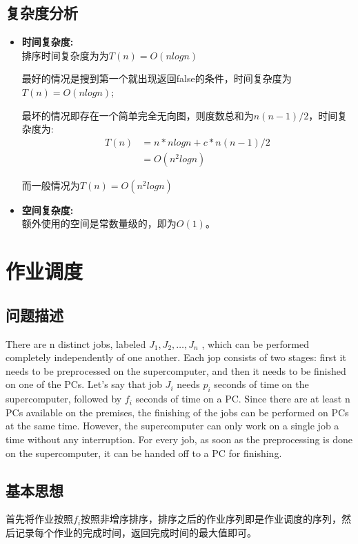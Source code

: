 \documentclass[UTF8,a4paper,12pt]{article}
\begin{document}
\begin{CJK}{UTF8}{gkai}
	\subsection{复杂度分析}		
		\begin{itemize}
			\item{\textbf{时间复杂度:}} \\
			排序时间复杂度为为$ T(n)=O(nlogn) $
			
			最好的情况是搜到第一个就出现返回false的条件，时间复杂度为$ T(n)=O(nlogn) $;
			
			最坏的情况即存在一个简单完全无向图，则度数总和为$ n(n-1)/2 $，时间复杂度为:
			\begin{align*}
			T(n) &= n*nlogn+c*n(n-1)/2\\
			&=O(n^{2}logn)
			\end{align*}
			
			而一般情况为$ T(n)=O(n^{2}logn) $
			
			\item{\textbf{空间复杂度:}}\\
			额外使用的空间是常数量级的，即为$ O(1) $。
		\end{itemize}


	\newpage
	\section{作业调度}
	\subsection{问题描述}
		There are n distinct jobs, labeled $ J_{1} , J_{2} , \dots , J_{n} $ , which can be performed completely independently of one another. Each jop consists of two stages: first it needs to be preprocessed on the supercomputer, and then it needs to be finished on one of the PCs. Let’s say that job $ J_{i} $ needs $ p_{i} $ seconds of time on the supercomputer, followed by $ f_{i} $ seconds of time on a PC. Since there are at least n PCs available on the premises, the finishing of the jobs can be performed on PCs at the same time. However, the supercomputer can only work on a single job a time without any interruption. For every job, as soon as the preprocessing is done on the supercomputer, it can be handed off to a PC for finishing.
	
	\subsection{基本思想}
		首先将作业按照$ f_{i} $按照非增序排序，排序之后的作业序列即是作业调度的序列，然后记录每个作业的完成时间，返回完成时间的最大值即可。
		

\end{CJK}
\end{document}
